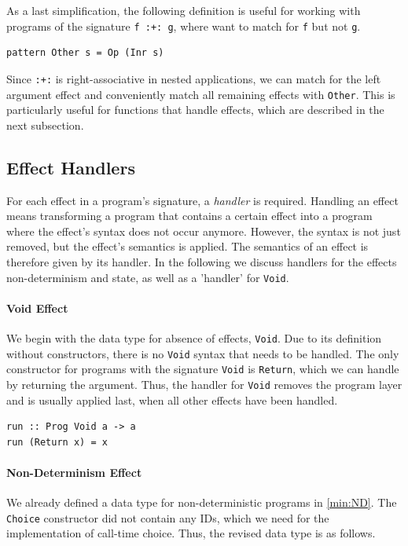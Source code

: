 \documentclass[a4paper, 11pt, fleqn, twoside, abstract=on]{scrreprt}
\newcommand{\hinl}[1]{\texttt{#1}}
\begin{document}
As a last simplification, the following definition is useful for working with programs of the signature \hinl{f :+: g}, where want to match for \hinl{f} but not \hinl{g}.

\begin{verbatim}
pattern Other s = Op (Inr s)
\end{verbatim}

Since \hinl{:+:} is right-associative in nested applications, we can match for the left argument effect and conveniently match all remaining effects with \hinl{Other}.
This is particularly useful for functions that handle effects, which are described in the next subsection.


\subsection{Effect Handlers}
\label{subsec:effectHandlers}
For each effect in a program's signature, a \textit{handler} is required.
Handling an effect means transforming a program that contains a certain effect into a program where the effect's syntax does not occur anymore.
However, the syntax is not just removed, but the effect's semantics is applied.
The semantics of an effect is therefore given by its handler.
In the following we discuss handlers for the effects non-determinism and state, as well as a 'handler' for \hinl{Void}.

\paragraph{Void Effect}
We begin with the data type for absence of effects, \hinl{Void}.
Due to its definition without constructors, there is no \hinl{Void} syntax that needs to be handled.
The only constructor for programs with the signature \hinl{Void} is \hinl{Return}, which we can handle by returning the argument.
Thus, the handler for \hinl{Void} removes the program layer and is usually applied last, when all other effects have been handled.

\begin{verbatim}
run :: Prog Void a -> a
run (Return x) = x
\end{verbatim}

\paragraph{Non-Determinism Effect}
We already defined a data type for non-deterministic programs in \autoref{min:ND}.
The \hinl{Choice} constructor did not contain any IDs, which we need for the implementation of call-time choice.
Thus, the revised data type is as follows.
\end{document}

